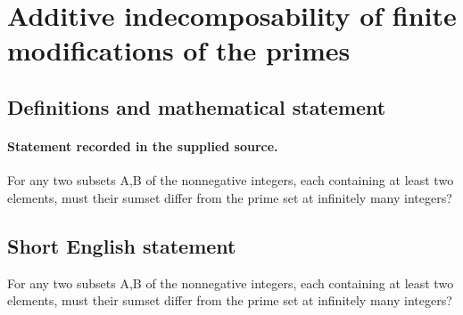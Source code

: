 \documentclass[11pt]{article}
\begin{document}
\section*{Additive indecomposability of finite modifications of the primes}\label{statement}
\subsection{Definitions and mathematical statement}
\paragraph{Statement recorded in the supplied source.}
For any two subsets A,B of the nonnegative integers, each containing at least two elements, must their sumset differ from the prime set at infinitely many integers?
\subsection{Short English statement}
For any two subsets A,B of the nonnegative integers, each containing at least two elements, must their sumset differ from the prime set at infinitely many integers?
\end{document}
